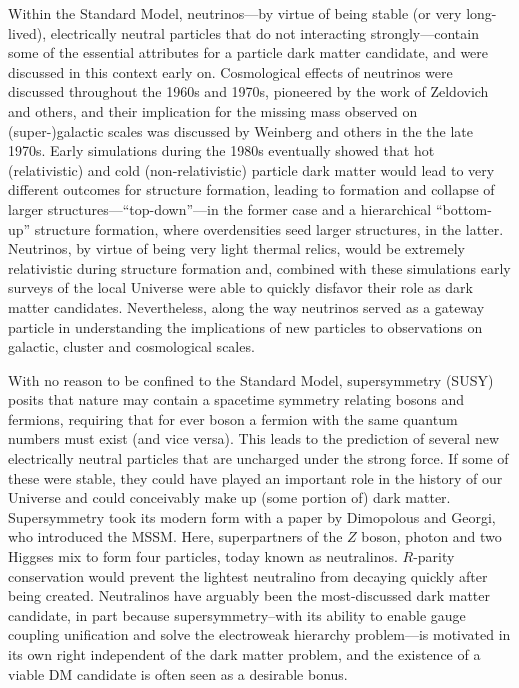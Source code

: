 Within the Standard Model, neutrinos---by virtue of being stable (or very long-lived), electrically neutral particles that do not interacting strongly---contain some of the essential attributes for a particle dark matter candidate, and were discussed in this context early on. Cosmological effects of neutrinos were discussed throughout the 1960s and 1970s, pioneered by the work of Zeldovich and others, and their implication for the missing mass observed on (super-)galactic scales was discussed by Weinberg and others in the the late 1970s. Early simulations during the 1980s eventually showed that hot (relativistic) and cold (non-relativistic) particle dark matter would lead to very different outcomes for structure formation, leading to formation and collapse of larger structures---``top-down''---in the former case and a hierarchical ``bottom-up'' structure formation, where overdensities seed larger structures, in the latter. Neutrinos, by virtue of being very light thermal relics, would be extremely relativistic during structure formation and, combined with these simulations early surveys of the local Universe were able to quickly disfavor their role as dark matter candidates. Nevertheless, along the way neutrinos served as a gateway particle in understanding the implications of new particles to observations on galactic, cluster and cosmological scales.

With no reason to be confined to the Standard Model, supersymmetry (SUSY) posits that nature may contain a spacetime symmetry relating bosons and fermions, requiring that for ever boson a fermion with the same quantum numbers must exist (and vice versa). This leads to the prediction of several new electrically neutral particles that are uncharged under the strong force. If some of these were stable, they could have played an important role in the history of our Universe and could conceivably make up (some portion of) dark matter. Supersymmetry took its modern form with a paper by Dimopolous and Georgi, who introduced the MSSM. Here, superpartners of the $Z$ boson, photon and two Higgses mix to form four particles, today known as neutralinos. $R$-parity conservation would prevent the lightest neutralino from decaying quickly after being created. Neutralinos have arguably been the most-discussed dark matter candidate, in part because supersymmetry--with its ability to enable gauge coupling unification and solve the electroweak hierarchy problem---is motivated in its own right independent of the dark matter problem, and the existence of a viable DM candidate is often seen as a desirable bonus.

